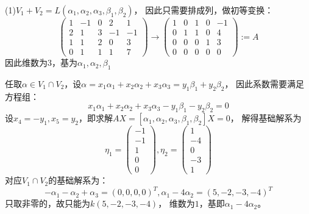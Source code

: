\begin{solution}
  (1)$V_1 + V_2 = L(\alpha_1,\alpha_2,\alpha_3,\beta_1,\beta_2)$，
  因此只需要排成列，做初等变换：
  \begin{equation*}
    \left(
      \begin{array}{ccccc}
        1&-1&0&2&1 \\
         2&1&3&-1&-1 \\
         1&1&2&0&3 \\
         0&1&1&1&7
      \end{array}
    \right) \rightarrow \left(
      \begin{array}{ccccc}
        1&0&1&0&-1 \\
         0&1&1&0&4 \\
         0&0&0&1&3 \\
         0&0&0&0&0
      \end{array}
    \right):= A
  \end{equation*}
  因此维数为$3$，基为$\alpha_1,\alpha_2,\beta_1$

  任取$\alpha \in V_1 \cap V_2$，设$\alpha = x_1\alpha_1 + x_2\alpha_2 + x_3\alpha_3 = y_1\beta_1 + y_2\beta_2$，
  因此系数需要满足方程组：
  \begin{equation*}
    x_1\alpha_1 + x_2\alpha_2 + x_3\alpha_3 - y_1\beta_1 - y_2\beta_2 = 0
  \end{equation*}
  设$x_4 = -y_1, x_5 = y_2$，即求解$AX = [\alpha_1,\alpha_2,\alpha_3,\beta_1,\beta_2]X =  0$，
  解得基础解系为
  \begin{equation*}
    \eta_1 = \left(
      \begin{array}{c}
        -1\\
        -1\\
        1\\
        0\\
        0
      \end{array}
    \right), \eta_2 = \left(
      \begin{array}{c}
        1\\
        -4\\
        0\\
        -3\\
        1
      \end{array}
    \right)
  \end{equation*}
  对应$V_1 \cap V_2$的基础解系为：
  \begin{equation*}
    -\alpha_1 -\alpha_2 + \alpha_3 = (0,0,0,0)^T, \alpha_1 - 4\alpha_2 = (5,-2,-3,-4)^T
  \end{equation*}
  只取非零的，故只能为$k(5,-2,-3,-4)$，
  维数为$1$，基即$\alpha_1 - 4\alpha_2$。
\end{solution}

